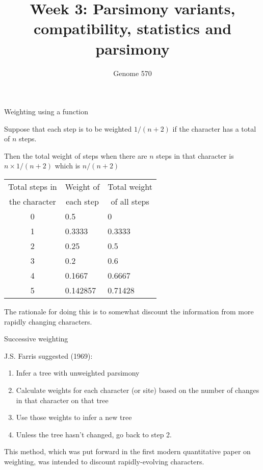 \documentclass[bluish,slideColor,colorBG,pdf]{prosper}
\title{Week 3:  Parsimony variants, compatibility, statistics and parsimony}
\author{Genome 570}
\begin{document}
\maketitle

\begin{slide}[Replace]{Weighting using a function}

Suppose that each step is to be weighted $1/(n+2)$ if the character
has a total of $n$ steps.
\bigskip

Then the total weight of steps when there are $n$ steps in that character is
$n \times 1/(n+2)$ which is  $n/(n+2)$
\bigskip

\begin{center}
\begin{tabular}{c | l l}
\multicolumn{1}{c}{Total steps in} & \multicolumn{1}{c}{Weight of} &
\multicolumn{1}{c}{Total weight} \\
\multicolumn{1}{c}{the character} & \multicolumn{1}{c}{each step} &
\multicolumn{1}{c}{of all steps} \\
\hline
0 & 0.5\raisebox{2pt}{\strut}  & 0 \\
1 & 0.3333 & 0.3333\\
2 & 0.25  & 0.5 \\
3 & 0.2 & 0.6 \\
4 & 0.1667 & 0.6667 \\
5 & 0.142857 & 0.71428
\end{tabular}
\end{center}

The rationale for doing this is to somewhat discount the information from
more rapidly changing characters.

\end{slide}

\begin{slide}[Replace]{Successive weighting}
\bigskip

J.S. Farris suggested (1969):

\begin{enumerate}
\item Infer a tree with unweighted parsimony
\item Calculate weights for each character (or site) based on the
number of changes in that character on that tree
\item Use those weights to infer a new tree
\item Unless the tree hasn't changed, go back to step 2.
\end{enumerate}
\bigskip

This method, which was put forward in the first modern quantitative paper
on weighting, was intended to discount rapidly-evolving characters.

\end{slide}
\end{document}
